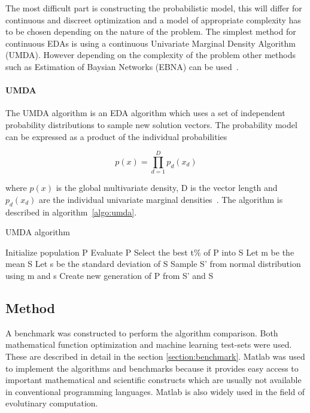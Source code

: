The most difficult part is constructing the probabilistic model, this will differ for continuous and discreet optimization and a model of appropriate complexity has to be chosen depending on the nature of the problem. The simplest method for continuous EDAs is using a continuous Univariate Marginal Density Algorithm (UMDA). However depending on the complexity of the problem other methods such as Estimation of Baysian Networks (EBNA) can be used~\cite{larranaga2012review}.

\paragraph{UMDA}
The UMDA algorithm is an EDA algorithm which uses a set of independent probability distributions to sample new solution vectors. The probability model can be expressed as a product of the individual probabilities

\begin{equation}
  p(x) = \prod _{d=1}^D {p_d(x_d)}
\end{equation}

where $p(x)$ is the global multivariate density, D is the vector length and $p_d(x_d)$ are the individual univariate marginal densities~\cite{povsik2004estimation}. The algorithm is described in algorithm~\ref{algo:umda}.

\begin{algorithm}[h]
  \caption{UMDA algorithm}
  \label{algo:umda}

    \begin{algorithmic}
      \State Initialize population P
      \Repeat
        \State Evaluate P
        \State Select the best t\% of P into S
        \State Let m be the mean S
        \State Let s be the standard deviation of S
        \State Sample S' from normal distribution using m and s
        \State Create new generation of P from S' and S
    \end{algorithmic}

\end{algorithm}

\subsection{Method}

A benchmark was constructed to perform the algorithm comparison. Both mathematical function optimization and machine learning test-sets were used. These are described in detail in the section \ref{section:benchmark}. Matlab was used to implement the algorithms and benchmarks because it provides easy access to important mathematical and scientific constructs which are usually not available in conventional programming languages. Matlab is also widely used in the field of evolutinary computation.
